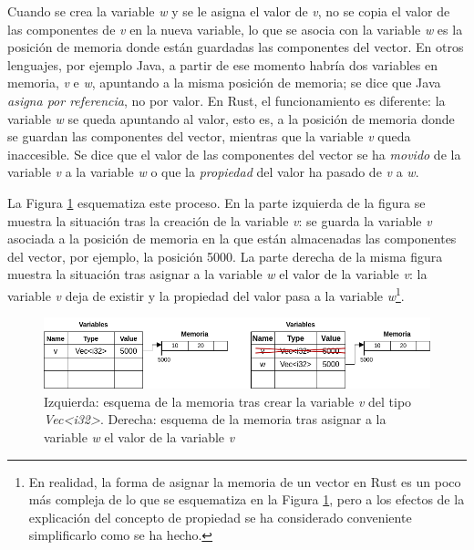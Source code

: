 Cuando se crea la variable \textit{w} y se le asigna el valor de \textit{v}, no se copia el valor de las componentes de \textit{v} en la nueva variable, lo que se asocia con la variable \textit{w} es la posición de memoria donde están guardadas las componentes del vector. En otros lenguajes, por ejemplo Java, a partir de ese momento habría dos variables en memoria, \textit{v} e \textit{w}, apuntando a la misma posición de memoria; se dice que Java \textit{asigna por referencia}, no por valor. En Rust, el funcionamiento es diferente: la variable \textit{w} se queda apuntando al valor, esto es, a la posición de memoria donde se guardan las componentes del vector, mientras que la variable \textit{v} queda inaccesible. Se dice que el valor de las componentes del vector se ha \textit{movido} de la variable \textit{v} a la variable \textit{w} o que la \textit{propiedad} del valor ha pasado de \textit{v} a \textit{w}.

La Figura \ref{fig_memoria_3} esquematiza este proceso. En la parte izquierda de la figura se muestra la situación tras la creación de la variable \textit{v}: se guarda la variable \textit{v} asociada a la posición de memoria en la que están almacenadas las componentes del vector, por ejemplo, la posición 5000. La parte derecha de la misma figura muestra la situación tras asignar a la variable \textit{w} el valor de la variable \textit{v}: la variable \textit{v} deja de existir y la propiedad del valor pasa a la variable \textit{w}\footnote{En realidad, la forma de asignar la memoria de un vector en Rust es un poco más compleja de lo que se esquematiza en la Figura \ref{fig_memoria_3}, pero a los efectos de la explicación del concepto de propiedad se ha considerado conveniente simplificarlo como se ha hecho.}.

\begin{figure}[htb]
   \begin{center}
      \includegraphics[width=\textwidth]{img/memoria_3.png}
      \caption{Izquierda: esquema de la memoria tras crear la variable \textit{v} del tipo \textit{Vec<i32>}. Derecha: esquema de la memoria tras asignar a la variable \textit{w} el valor de la variable \textit{v}}
      \label{fig_memoria_3}
   \end{center}
\end{figure}

